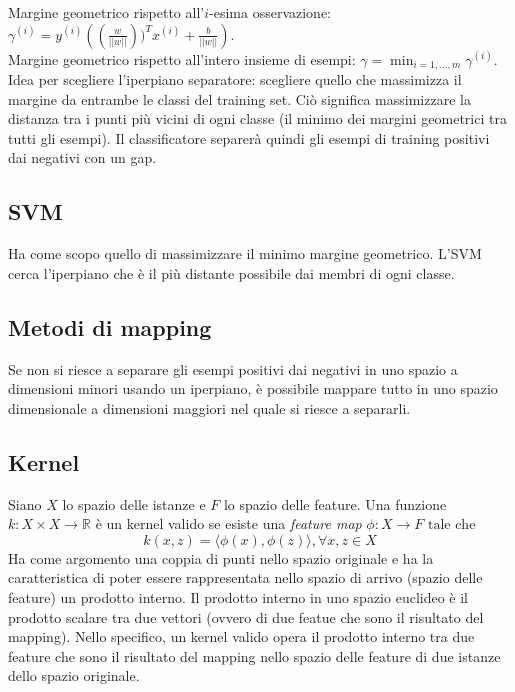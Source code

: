 Margine geometrico rispetto all’$i$-esima osservazione: $\gamma^{(i)} = y^{(i)} \left(\left(\displaystyle \frac{w}{||w||}\right))^T x^{(i)} + \frac{b}{||w||} \right)$. \\
Margine geometrico rispetto all’intero insieme di esempi: $\displaystyle \gamma =  \min_{i = 1, \dots, m} \gamma^{(i)}$.\\

Idea per scegliere l’iperpiano separatore: scegliere quello che massimizza il margine da entrambe le classi del training set. Ciò significa massimizzare la distanza tra i punti più vicini di ogni classe (il minimo dei margini geometrici tra tutti gli esempi). Il classificatore separerà quindi gli esempi di training positivi dai negativi con un gap.
\subsection{SVM}
Ha come scopo quello di massimizzare il minimo margine geometrico. L’SVM cerca l’iperpiano che è il più distante possibile dai membri di ogni classe.

\subsection{Metodi di mapping}
Se non si riesce a separare gli esempi positivi dai negativi in uno spazio a dimensioni minori usando un iperpiano, è possibile mappare tutto in uno spazio dimensionale a dimensioni maggiori nel quale si riesce a separarli.

\subsection{Kernel}
Siano $X$ lo spazio delle istanze e $F$ lo spazio delle feature.
Una funzione $k : X \times X \to \mathbb{R}$ è un kernel valido se esiste una \textit{feature map} $\phi : X \to F \mbox{ tale che }$ \[k(x, z) = \langle\phi(x), \phi(z)\rangle, \forall x, z \in X\]
Ha come argomento una coppia di punti nello spazio originale e ha la caratteristica di poter essere rappresentata nello spazio di arrivo (spazio delle feature) un prodotto interno. Il prodotto interno in uno spazio euclideo è il prodotto scalare tra due vettori (ovvero di due featue che sono il risultato del mapping). Nello specifico, un kernel valido opera il prodotto interno tra due feature che sono il risultato del mapping nello spazio delle feature di due istanze dello spazio originale.\\

